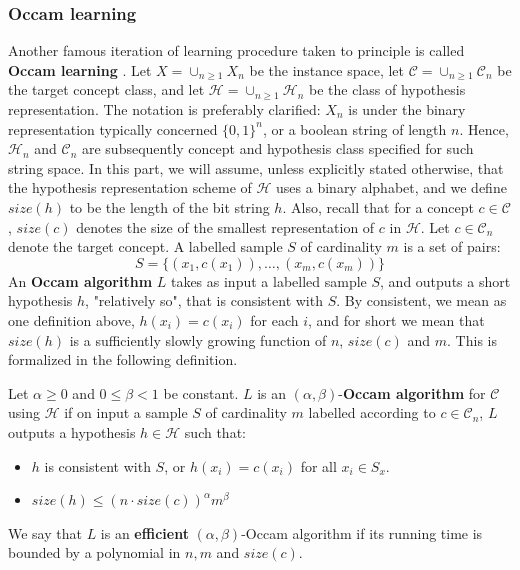 \documentclass{article}
\begin{document}
\subsubsection{Occam learning}
Another famous iteration of learning procedure taken to principle is called \textbf{Occam learning} \cite{10.5555/200548}. Let $X= \cup_{n\geq 1} X_n$ be the instance space, let $\mathcal{C}=\cup_{n\geq 1}\mathcal{C}_{n}$ be the target concept class, and let $\mathcal{H}= \cup_{n\geq 1}\mathcal{H}_{n}$ be the class of hypothesis representation. The notation is preferably clarified: $X_{n}$ is under the binary representation typically concerned $\{0,1\}^{n}$, or a boolean string of length $n$. Hence, $\mathcal{H}_{n}$ and $\mathcal{C}_{n}$ are subsequently concept and hypothesis class specified for such string space. In this part, we will assume, unless explicitly stated otherwise, that the hypothesis representation scheme of $\mathcal{H}$ uses a binary alphabet, and we define $size(h)$ to be the length of the bit string $h$. Also, recall that for a concept $c\in \mathcal{C}$, $size(c)$ denotes the size of the smallest representation of $c$ in $\mathcal{H}$. Let $c\in \mathcal{C}_{n}$ denote the target concept. A labelled sample $S$ of cardinality $m$ is a set of pairs: 
\begin{equation*}
    S = \{(x_1, c(x_1)),\dots,(x_m, c(x_m))\}
\end{equation*}
An \textbf{Occam algorithm} $L$ takes as input a labelled sample $S$, and outputs a short hypothesis $h$, "relatively so", that is consistent with $S$. By consistent, we mean as one definition above, $h(x_{i})= c(x_{i})$ for each $i$, and for short we mean that $size(h)$ is a sufficiently slowly growing function of $n$, $size(c)$ and $m$. This is formalized in the following definition. 

\begin{definition}
    Let $\alpha \geq 0$ and $0\leq \beta < 1$ be constant. $L$ is an $(\alpha, \beta)$-\textbf{Occam algorithm} for $\mathcal{C}$ using $\mathcal{H}$ if on input a sample $S$ of cardinality $m$ labelled according to $c\in \mathcal{C}_{n}$, $L$ outputs a hypothesis $h\in \mathcal{H}$ such that: 
    \begin{itemize}
        \item $h$ is consistent with $S$, or $h(x_{i})=c(x_i)$ for all $x_{i}\in S_{x}$. 
        \item $size(h)\leq (n\cdot size(c))^{\alpha}m^{\beta}$
    \end{itemize}
    We say that $L$ is an \textbf{efficient} $(\alpha,\beta)$-Occam algorithm if its running time is bounded by a polynomial in $n,m$ and $size(c)$.  
\end{definition}
\end{document}

